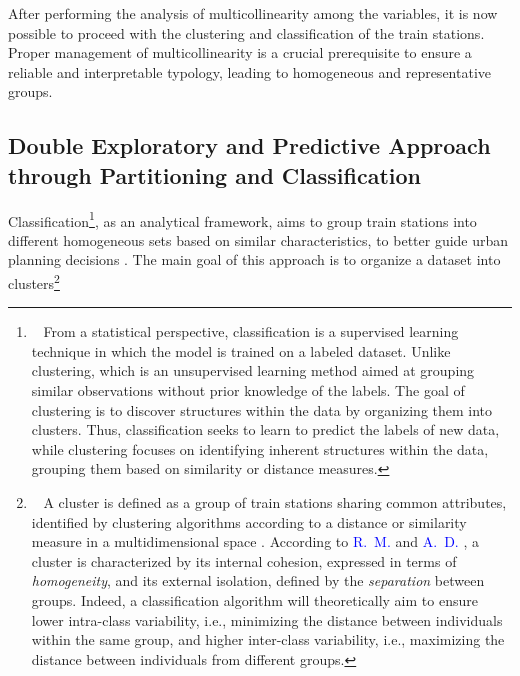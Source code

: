\begin{refsegment}
After performing the analysis of multicollinearity among the variables, it is now possible to proceed with the clustering and classification of the train stations. Proper management of multicollinearity is a crucial prerequisite to ensure a reliable and interpretable typology, leading to homogeneous and representative groups.%

\subsection{Double Exploratory and Predictive Approach through Partitioning and Classification
    \label{chap6:methodologie-statistiques-clusterisation-classification}
    }

Classification\footnote{~
    From a statistical perspective, classification is a supervised learning technique in which the model is trained on a labeled dataset. Unlike clustering, which is an unsupervised learning method aimed at grouping similar observations without prior knowledge of the labels. The goal of clustering is to discover structures within the data by organizing them into clusters. Thus, classification seeks to learn to predict the labels of new data, while clustering focuses on identifying inherent structures within the data, grouping them based on similarity or distance measures.
}, as an analytical framework, aims to group train stations into different homogeneous sets based on similar characteristics, to better guide urban planning decisions \textcolor{blue}{\autocite[2]{cao_coordination_2020}}. The main goal of this approach is to organize a dataset into clusters\footnote{~
    A cluster is defined as a group of train stations sharing common attributes, identified by clustering algorithms according to a distance or similarity measure in a multidimensional space \textcolor{blue}{\autocite[7]{everitt_cluster_2011}}. According to \textcolor{blue}{R.~M.} \textcolor{blue}{\textcite[321]{cormack_review_1971}} and \textcolor{blue}{A.~D.} \textcolor{blue}{\textcite[15]{gordon_classification_1999}}, a cluster is characterized by its internal cohesion, expressed in terms of \textsl{homogeneity}, and its external isolation, defined by the \textsl{separation} between groups. Indeed, a classification algorithm will theoretically aim to ensure lower intra-class variability, i.e., minimizing the distance between individuals within the same group, and higher inter-class variability, i.e., maximizing the distance between individuals from different groups.
}
\end{refsegment}
